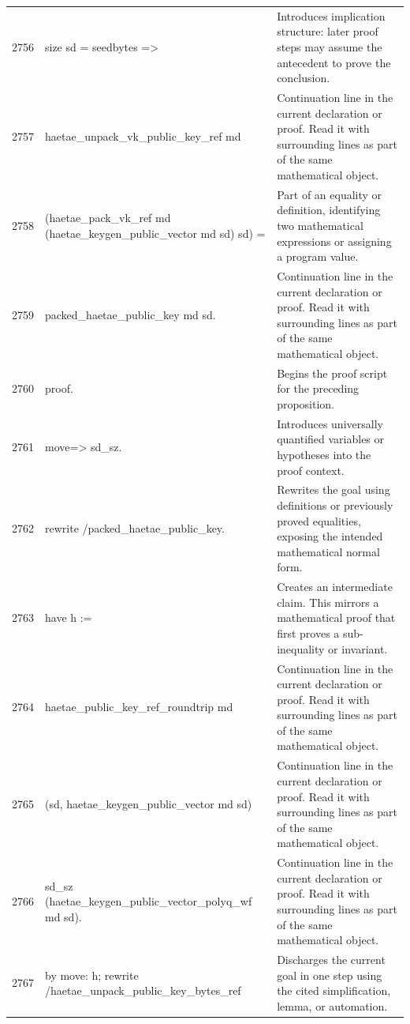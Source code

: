 \documentclass[10pt]{article}
\begin{document}
\begin{longtable}{r L{0.53\textwidth} L{0.37\textwidth}}
2756 & {\ttfamily\scriptsize   size sd = seedbytes =>} & Introduces implication structure: later proof steps may assume the antecedent to prove the conclusion. \\
2757 & {\ttfamily\scriptsize   haetae\_unpack\_vk\_public\_key\_ref md} & Continuation line in the current declaration or proof.  Read it with surrounding lines as part of the same mathematical object. \\
2758 & {\ttfamily\scriptsize     (haetae\_pack\_vk\_ref md (haetae\_keygen\_public\_vector md sd) sd) =} & Part of an equality or definition, identifying two mathematical expressions or assigning a program value. \\
2759 & {\ttfamily\scriptsize   packed\_haetae\_public\_key md sd.} & Continuation line in the current declaration or proof.  Read it with surrounding lines as part of the same mathematical object. \\
2760 & {\ttfamily\scriptsize proof.} & Begins the proof script for the preceding proposition. \\
2761 & {\ttfamily\scriptsize move=> sd\_sz.} & Introduces universally quantified variables or hypotheses into the proof context. \\
2762 & {\ttfamily\scriptsize rewrite /packed\_haetae\_public\_key.} & Rewrites the goal using definitions or previously proved equalities, exposing the intended mathematical normal form. \\
2763 & {\ttfamily\scriptsize have h :=} & Creates an intermediate claim.  This mirrors a mathematical proof that first proves a sub-inequality or invariant. \\
2764 & {\ttfamily\scriptsize   haetae\_public\_key\_ref\_roundtrip md} & Continuation line in the current declaration or proof.  Read it with surrounding lines as part of the same mathematical object. \\
2765 & {\ttfamily\scriptsize     (sd, haetae\_keygen\_public\_vector md sd)} & Continuation line in the current declaration or proof.  Read it with surrounding lines as part of the same mathematical object. \\
2766 & {\ttfamily\scriptsize     sd\_sz (haetae\_keygen\_public\_vector\_polyq\_wf md sd).} & Continuation line in the current declaration or proof.  Read it with surrounding lines as part of the same mathematical object. \\
2767 & {\ttfamily\scriptsize by move: h; rewrite /haetae\_unpack\_public\_key\_bytes\_ref} & Discharges the current goal in one step using the cited simplification, lemma, or automation. \\

\end{longtable}
\end{document}

